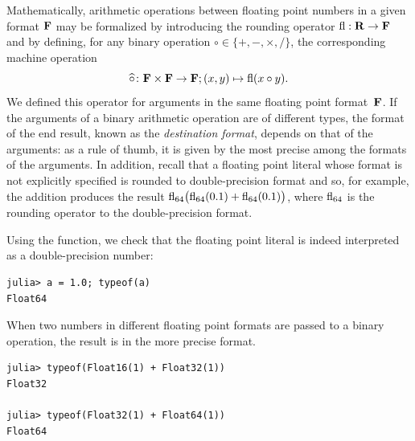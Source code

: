 Mathematically,
arithmetic operations between floating point numbers in a given format $\mathbf F$ may be formalized by introducing
the rounding operator ${\rm fl}: \mathbf R \to \mathbf F$ and
by defining, for any binary operation $\circ \in \{+, -, \times, /\}$,
the corresponding machine operation
\[
    \widehat \circ\colon \mathbf F \times \mathbf F \rightarrow \mathbf F; (x, y) \mapsto {\rm fl}(x \circ y).
\]
We defined this operator for arguments in the same floating point format~$\mathbf F$.
If the arguments of a binary arithmetic operation are of different types,
the format of the end result,
known as the \emph{destination format},
depends on that of the arguments:
as a rule of thumb,
it is given by the most precise among the formats of the arguments.
In addition, recall that a floating point literal whose format is not explicitly specified is rounded to double-precision format
and so, for example, the addition  produces the result ${\rm fl_{64}}\bigl(\rm fl_{64}(0.1) + \rm fl_{64}(0.1)\bigr)$,
where ${\rm fl}_{64}$ is the rounding operator to the double-precision format.

\begin{example}
    Using the  function,
    we check that the floating point literal  is indeed interpreted as a double-precision number:
\begin{verbatim}
julia> a = 1.0; typeof(a)
Float64
\end{verbatim}
When two numbers in different floating point formats are passed to a binary operation,
the result is in the more precise format.
\begin{verbatim}
julia> typeof(Float16(1) + Float32(1))
Float32

julia> typeof(Float32(1) + Float64(1))
Float64
\end{verbatim}
\end{example}

